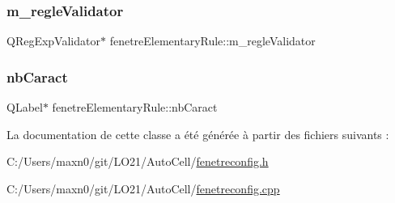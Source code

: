 \mbox{\label{classfenetre_elementary_rule_a6a36eabf6f070882df6afe328debd6a4}} 
\subsubsection{\texorpdfstring{m\+\_\+regle\+Validator}{m\_regleValidator}}
{\footnotesize\ttfamily Q\+Reg\+Exp\+Validator$\ast$ fenetre\+Elementary\+Rule\+::m\+\_\+regle\+Validator\hspace{0.3cm}{\ttfamily [private]}}

\mbox{\label{classfenetre_elementary_rule_a34ced18693114e7bdd0030b26878e3c5}} 
\subsubsection{\texorpdfstring{nb\+Caract}{nbCaract}}
{\footnotesize\ttfamily Q\+Label$\ast$ fenetre\+Elementary\+Rule\+::nb\+Caract\hspace{0.3cm}{\ttfamily [private]}}



La documentation de cette classe a été générée à partir des fichiers suivants \+:\begin{DoxyCompactItemize}
\item 
C\+:/\+Users/maxn0/git/\+L\+O21/\+Auto\+Cell/\mbox{\hyperlink{fenetreconfig_8h}{fenetreconfig.\+h}}\item 
C\+:/\+Users/maxn0/git/\+L\+O21/\+Auto\+Cell/\mbox{\hyperlink{fenetreconfig_8cpp}{fenetreconfig.\+cpp}}\end{DoxyCompactItemize}
